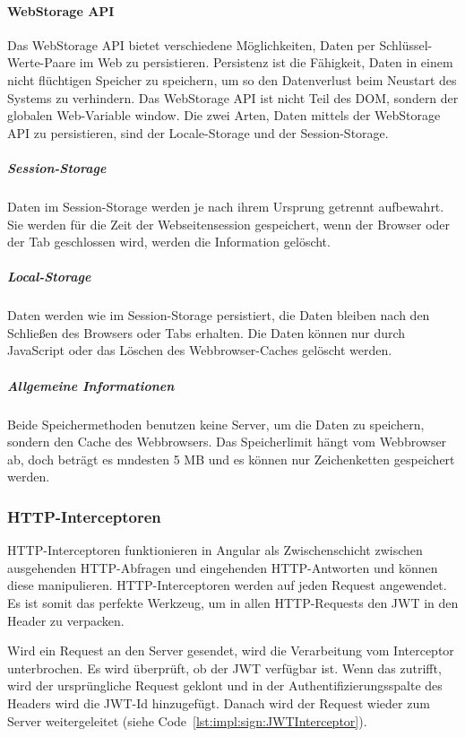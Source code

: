 \paragraph{WebStorage API}
\label{par:impl:usermanagment:WebStorage}
Das WebStorage API bietet verschiedene Möglichkeiten, Daten per Schlüssel-Werte-Paare im Web zu persistieren. Persistenz ist die Fähigkeit, Daten in einem nicht flüchtigen Speicher zu speichern, um so den Datenverlust beim Neustart des Systems zu verhindern. Das WebStorage API ist nicht Teil des DOM, sondern der globalen Web-Variable window. Die zwei Arten, Daten mittels der WebStorage API zu persistieren, sind der Locale-Storage und der Session-Storage.
\cite{WikiPersistenzDefinition} \cite{WebStorageAPI}


\subparagraph{Session-Storage}
Daten im Session-Storage werden je nach ihrem Ursprung getrennt aufbewahrt. Sie werden für die Zeit der Webseitensession gespeichert, wenn der Browser oder der Tab geschlossen wird, werden die Information gelöscht.
\cite{WebStorageAPI}

\subparagraph{Local-Storage}
Daten werden wie im Session-Storage persistiert, die Daten bleiben nach den Schließen des Browsers oder Tabs erhalten. Die Daten können nur durch JavaScript oder das Löschen des Webbrowser-Caches gelöscht werden.
\cite{WebStorageAPI}

\subparagraph{Allgemeine Informationen}
Beide Speichermethoden benutzen keine Server, um die Daten zu speichern, sondern den Cache des Webbrowsers. Das Speicherlimit hängt vom Webbrowser ab, doch beträgt es mndesten 5 MB und es können nur Zeichenketten gespeichert werden.
\cite{WebStorageAPI}

\subsubsection{HTTP-Interceptoren}
HTTP-Interceptoren funktionieren in Angular als Zwischenschicht zwischen ausgehenden HTTP-Abfragen und eingehenden HTTP-Antworten und können diese manipulieren.
 HTTP-Interceptoren werden auf jeden Request angewendet. Es ist somit das perfekte Werkzeug, um in allen HTTP-Requests den JWT in den Header zu verpacken.
\cite[10.3 Interceptoren: HTTP-Requests abfangen und transformieren]{AngularBuch}

Wird ein Request an den Server gesendet, wird die Verarbeitung vom Interceptor unterbrochen. Es wird überprüft, ob der JWT verfügbar ist. Wenn das zutrifft, wird der ursprüngliche Request geklont und in der Authentifizierungsspalte des Headers wird die JWT-Id hinzugefügt. Danach wird der Request wieder zum Server weitergeleitet (siehe Code \ref{lst:impl:sign:JWTInterceptor}). 

